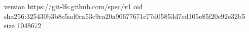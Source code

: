 version https://git-lfs.github.com/spec/v1
oid sha256:325430b3b8e5ad0ca53c9ca20a90677671c77d05853d7ed105e85f20e92e32b5
size 1048672
